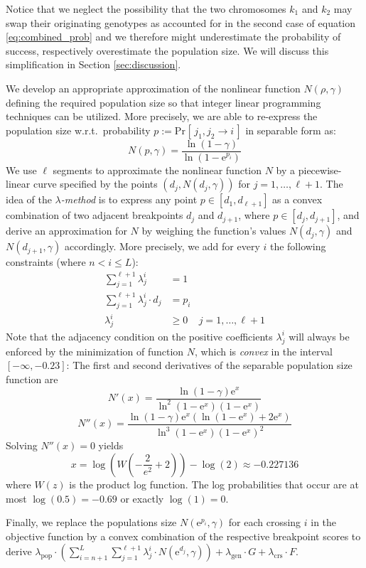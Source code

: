 \documentclass[runningheads]{llncs}
\renewcommand{\Pr}[2][]{\mathrm{Pr}_{#1} [\, #2 \, ]}
\begin{document}
Notice that we neglect the possibility that the two chromosomes $k_1$ and $k_2$ may swap their originating genotypes as accounted for in the 
second case of equation \eqref{eq:combined_prob} and we therefore might underestimate the probability of success, respectively overestimate
the population size. We will discuss this simplification in Section \ref{sec:discussion}.

We develop an appropriate approximation of the nonlinear function $N(\rho, \gamma)$ defining the required population size so that integer linear 
programming techniques can be utilized.
More precisely, we are able to re-express the population size w.r.t.\ probability $p:=\Pr[]{j_1,j_2\rightarrow i}$ in separable form as: 
$$ N(p,\gamma) = \frac{\ln(1-\gamma)}{\ln(1-\mathrm e^{p_i})} $$
We use $\ell$ segments to approximate the nonlinear function $N$ by a
piecewise-linear curve specified by the points $(d_j,N(d_j,\gamma))$ for
$j=1,\dots,\ell+1$. The idea of the \emph{$\lambda$-method} \cite{Steuer:1986} is to
express any point $p\in[d_1,d_{\ell+1}]$ as a convex combination of two adjacent
breakpoints $d_j$ and $d_{j+1}$, where  $p\in[d_j,d_{j+1}]$, and derive an
approximation for $N$ by weighing the function's values $N(d_j,\gamma)$ and
$N(d_{j+1},\gamma)$ accordingly. More precisely, we add for every $i$ the following
constraints (where $n < i \leq L$):
\begin{align}
  \sum_{j=1}^{\ell+1} \lambda^i_j &= 1&\\
  \sum_{j=1}^{\ell+1} \lambda^i_j\cdot d_j &= p_i&\label{ttt}\\
  \lambda^i_j&\geq 0& j=1,\dots,\ell+1
\end{align}
Note that the adjacency condition on the positive coefficients $\lambda^i_j$ will
always be enforced by the minimization of function $N$, which is \emph{convex}
in the interval $[-\infty,-0.23]$:
The first and second derivatives of the separable population size function are
$$N'(x)=\frac{\ln(1-\gamma)\mathrm e^x}{\ln^2(1-\mathrm e^x)(1-\mathrm e^x)}$$
$$N''(x)=\frac{\ln(1-\gamma)\mathrm e^x\left(\ln(1-\mathrm e^x)+2\mathrm e^x\right)}{\ln^3(1-\mathrm e^x)(1-\mathrm e^x)^2}$$
Solving $N''(x) = 0$ yields
\[
x = \log(W\left(-\frac{2}{e^2}+2\right)) - \log(2) \approx -0.227136
\]
where $W(z)$ is the product log function.
The log probabilities that occur are at most $\log(0.5) = -0.69$ or exactly $\log(1)=0$. 


Finally, we replace the populations size $N(\mathrm e^{p_i},\gamma)$ for each crossing $i$
in the objective function by a convex combination of the respective breakpoint scores to derive 
$\lambda_{\mathrm{pop}}\cdot\left(\sum_{i=n+1}^L\sum_{j=1}^{\ell+1} \lambda^i_j\cdot N(\mathrm e^{d_j},\gamma)\right) + \lambda_{\mathrm{gen}}\cdot G + \lambda_{\mathrm{crs}}\cdot F.$
\end{document}
